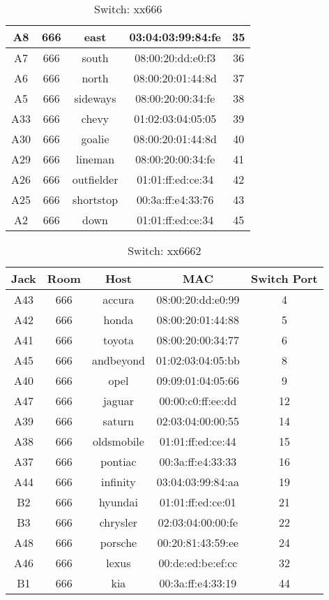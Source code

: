 \documentclass{article}
\begin{document}
\begin{table}[!htb]
\begin{tabular}{ | c | c | c | c | c | }
	A8 & 666 & east  & 03:04:03:99:84:fe & 35 \\ \hline
	A7 & 666 & south  & 08:00:20:dd:e0:f3 & 36 \\ \hline
	A6 & 666 & north & 08:00:20:01:44:8d & 37 \\ \hline
	A5 & 666 & sideways & 08:00:20:00:34:fe & 38 \\ \hline
	A33 & 666 & chevy & 01:02:03:04:05:05 & 39 \\ \hline
	A30 & 666 & goalie & 08:00:20:01:44:8d & 40 \\ \hline
	A29 & 666 & lineman & 08:00:20:00:34:fe & 41 \\ \hline
	A26 & 666 & outfielder & 01:01:ff:ed:ce:34 & 42 \\ \hline
	A25 & 666 & shortstop & 00:3a:ff:e4:33:76 & 43 \\ \hline
	A2 & 666 & down & 01:01:ff:ed:ce:34 & 45 \\ \hline
	\end{tabular}
	\caption{Switch: xx666}
\end{table}
\begin{table}[!htb]
	\centering
	\begin{tabular}{ | c | c | c | c | c | }
	\hline
	\textbf{Jack} & \textbf{Room} & \textbf{Host} & \textbf{MAC} & \textbf{Switch Port} \\ \hline
	A43 & 666 & accura & 08:00:20:dd:e0:99 & 4 \\ \hline
	A42 & 666 & honda & 08:00:20:01:44:88 & 5 \\ \hline
	A41 & 666 & toyota & 08:00:20:00:34:77 & 6 \\ \hline
	A45 & 666 & andbeyond & 01:02:03:04:05:bb & 8 \\ \hline
	A40 & 666 & opel & 09:09:01:04:05:66 & 9 \\ \hline
	A47 & 666 & jaguar & 00:00:c0:ff:ee:dd & 12 \\ \hline
	A39 & 666 & saturn & 02:03:04:00:00:55 & 14 \\ \hline
	A38 & 666 & oldsmobile & 01:01:ff:ed:ce:44 & 15 \\ \hline
	A37 & 666 & pontiac & 00:3a:ff:e4:33:33 & 16 \\ \hline
	A44 & 666 & infinity & 03:04:03:99:84:aa & 19 \\ \hline
	B2 & 666 & hyundai & 01:01:ff:ed:ce:01 & 21 \\ \hline
	B3 & 666 & chrysler & 02:03:04:00:00:fe & 22 \\ \hline
	A48 & 666 & porsche & 00:20:81:43:59:ee & 24 \\ \hline
	A46 & 666 & lexus & 00:de:ed:be:ef:cc & 32 \\ \hline
	B1 & 666 & kia & 00:3a:ff:e4:33:19 & 44 \\ \hline
	\end{tabular}
	\caption{Switch: xx6662}
\end{table}
\end{document}
